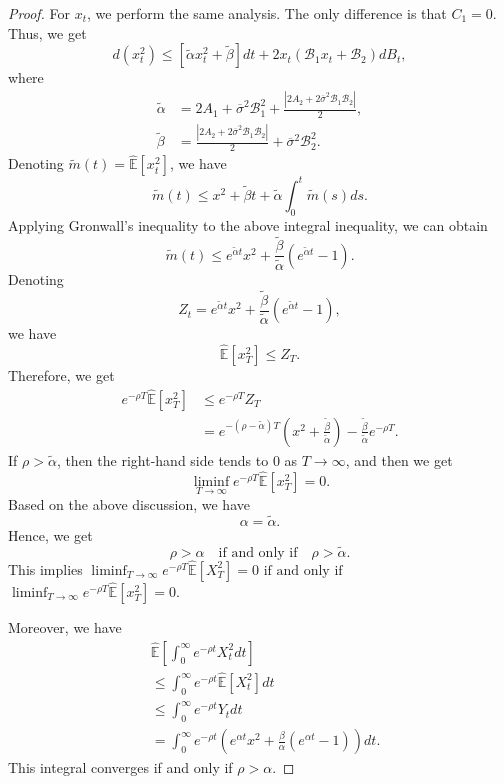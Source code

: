 \documentclass[onecolumn, journal]{IEEEtran} %
\begin{document}
\begin{proof}
		For $x_t$, we perform the same analysis. The only difference is that $C_1 = 0$. Thus, we get
		\[
		d(x_t^2) \leq \left[ \tilde{\alpha} x_t^2 + \tilde{\beta} \right] dt + 2 x_t ( \mathcal{B}_1 x_t + \mathcal{B}_2 ) d B_t,
		\]
		where
		\begin{align}
			\tilde{\alpha} &= 2A_1 + \overline{\sigma}^2 \mathcal{B}_1^2 + \frac{|2A_2 + 2\overline{\sigma}^2 \mathcal{B}_1 \mathcal{B}_2|}{2}\label{A.3}, \tag{A.3} \\
			\tilde{\beta}  &= \frac{|2A_2 + 2\overline{\sigma}^2 \mathcal{B}_1 \mathcal{B}_2|}{2} + \overline{\sigma}^2 \mathcal{B}_2^2. \nonumber
		\end{align}
		Denoting $\tilde{m}(t) = \hat{\mathbb{E}}[x_t^2]$, we have
		\[
		\tilde{m}(t) \leq x^2 + \tilde{\beta} t + \tilde{\alpha} \int_0^t \tilde{m}(s)  ds.
		\]
		Applying Gronwall's inequality to the above integral inequality, we can obtain
		\[
		\tilde{m}(t) \leq e^{\tilde{\alpha} t} x^{2} + \frac{\tilde{\beta}}{\tilde{\alpha}} (e^{\tilde{\alpha} t} - 1).
		\]
		Denoting
		\begin{equation*}
			Z_t = e^{\tilde{\alpha}t} x^2 + \frac{\tilde{\beta}}{\tilde{\alpha}} (e^{\tilde{\alpha}t} - 1) \label{A.4}\tag{A.4},
		\end{equation*}
		we have
		\[
		\hat{\mathbb{E}}[x_T^2] \leq Z_T.
		\]
		Therefore, we get
		\[
		\begin{aligned}
			e^{-\rho T} \hat{\mathbb{E}}[x_T^2] 
			& \leq e^{-\rho T} Z_T \\
			& = e^{-(\rho - \tilde{\alpha})T} \left(x^2 + \frac{\tilde{\beta}}{\tilde{\alpha}}\right) - \frac{\tilde{\beta}}{\tilde{\alpha}} e^{-\rho T}.
		\end{aligned}
		\]
		If \( \rho > \tilde{\alpha} \), then the right-hand side tends to 0 as $T \to \infty$, and then we get
		\[
		\liminf_{T \to \infty} e^{-\rho T} \hat{\mathbb{E}}[x_T^2] = 0.
		\]
		Based on the above discussion, we have
		\[
		\alpha = \tilde{\alpha}.
		\]
		Hence, we get
		\[
		\rho > \alpha \quad \text{if and only if} \quad \rho > \tilde{\alpha}.
		\]
		This implies $\liminf_{T \to \infty} e^{-\rho T} \hat{\mathbb{E}}[X_T^2] = 0 \text{ if and only if }$ \\
		$\liminf_{T \to \infty} e^{-\rho T} \hat{\mathbb{E}}[x_T^2] = 0.$
		
		Moreover, we have
		\begin{align*}
			&\hat{\mathbb{E}}\left[\int_{0}^{\infty}e^{-\rho t}X_{t}^{2}dt\right] \\
			&\leq \int_{0}^{\infty}e^{-\rho t}\hat{\mathbb{E}}[X_{t}^{2}]dt \\
			&\leq \int_{0}^{\infty}e^{-\rho t}Y_{t}dt \\
			&= \int_{0}^{\infty}e^{-\rho t}\left(e^{\alpha t}x^{2}+\frac{\beta}{\alpha}(e^{\alpha t}-1)\right)dt.
		\end{align*}
		This integral converges if and only if $\rho > \alpha$.
		

\end{proof}
\end{document}
